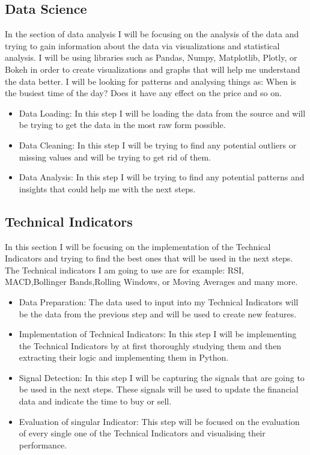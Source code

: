 \documentclass{imc-inf}
\begin{document}
	\subsection{Data Science}
	In the section of data analysis I will be focusing on the analysis of the data and trying to gain information about 
	the data via visualizations and statistical analysis. I will be using libraries such as Pandas, Numpy, Matplotlib, Plotly, or Bokeh 
	in order to create visualizations and graphs that will help me understand the data better. I will be looking for patterns and analysing things as:
	When is the busiest time of the day? Does it have any effect on the price and so on.
	\begin{itemize}
		\item Data Loading: In this step I will be loading the data from the source and will be trying to get the data in the most raw form possible.
		\item Data Cleaning: In this step I will be trying to find any potential outliers or missing values and will be trying to get rid of them.
		\item  Data Analysis: In this step I will be trying to find any potential patterns and insights that could help me with the next steps.
	\end{itemize}

	\subsection{Technical Indicators}
	In this section I will be focusing on the implementation of the Technical Indicators and trying to find the best ones that will be used in the next steps.
	The Technical indicators I am going to use are for example: RSI, MACD,Bollinger Bands,Rolling Windows, or Moving Averages and many more.
	\begin{itemize}
		\item Data Preparation: The data used to input into my Technical Indicators will be the data from the previous step and will be used to create new features.
		\item Implementation of Technical Indicators: In this step I will be implementing the Technical Indicators by at first thoroughly studying them and then extracting 
		their logic and implementing them in Python. 
		\item Signal Detection: In this step I will be capturing the signals that are going to be used in the next steps. These signals will be used to update the financial data and indicate the time to buy or sell.
		\item Evaluation of singular Indicator: This step will be focused on the evaluation of every single one of the Technical Indicators and visualising their performance.
	\end{itemize}
\end{document}
